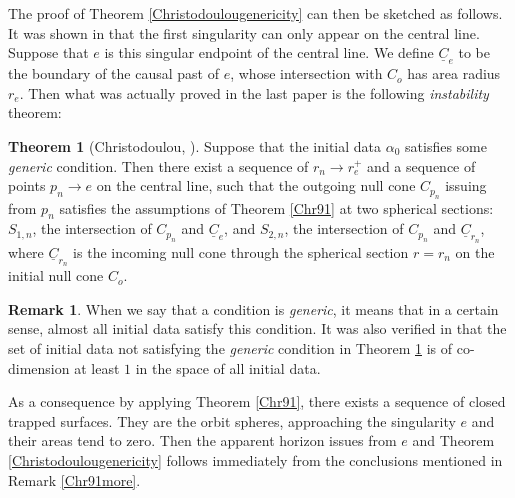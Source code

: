 \documentclass[11pt,reqno]{amsart}
\theoremstyle{definition}
\newtheorem{theorem}{Theorem}[section]
\newtheorem{remark}{Remark}[section]
\numberwithin{equation}{section}
\def\Cb{\underline{C}}
\begin{document}
The proof of Theorem \ref{Christodoulougenericity} can then be sketched as follows. It was shown in \cite{Chr93} that the first singularity can only appear on the central line. Suppose that $e$ is this singular endpoint of the central line. We define $\Cb_e$ to be the boundary of the causal past of $e$, whose intersection with $C_o$ has area radius $r_e$. Then what was actually proved in the last paper \cite{Chr99} is the following \emph{instability} theorem:
\begin{theorem}[Christodoulou, \cite{Chr99}]\label{Christodoulouinstability} Suppose that the initial data $\alpha_0$ satisfies some \emph{generic} condition. Then there exist a sequence of $r_n\to r_e^+$ and a sequence of points $p_n\to e$ on the central line, such that the outgoing null cone $C_{p_n}$ issuing from $p_n$ satisfies the assumptions of Theorem \ref{Chr91} at two spherical sections: $S_{1,n}$, the intersection of $C_{p_n}$ and $\Cb_e$, and $S_{2,n}$, the intersection of $C_{p_n}$ and $\Cb_{r_n}$, where $\Cb_{r_n}$ is the incoming null cone through the spherical section $r=r_n$ on the initial null cone $C_o$.
\end{theorem}
\begin{remark}
When we say that a condition is \emph{generic}, it means that in a certain sense, almost all initial data satisfy this condition. It was also verified in \cite{Chr99} that the set of initial data not satisfying the \emph{generic} condition in Theorem \ref{Christodoulouinstability} is of co-dimension at least $1$ in the space of all initial data.
\end{remark}
As a consequence by applying Theorem \ref{Chr91}, there exists a sequence of closed trapped surfaces. They are the orbit spheres, approaching the singularity $e$ and their areas tend to zero. Then the apparent horizon issues from $e$ and Theorem \ref{Christodoulougenericity} follows immediately from the conclusions mentioned in Remark \ref{Chr91more}.
\end{document}
